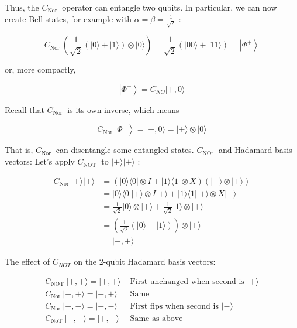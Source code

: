 \documentclass[main.tex]{subfiles}
\begin{document}
    Thus, the $C_{\text {Nor }}$ operator can entangle two qubits. In particular, we can now create Bell states, for example with $\alpha=\beta=\frac{1}{\sqrt{2}}$ :
    
    $$
    C_{\text {Nor }}\left(\frac{1}{\sqrt{2}}(|0\rangle+|1\rangle) \otimes|0\rangle\right)=\frac{1}{\sqrt{2}}(|00\rangle+|11\rangle)=\left|\Phi^{+}\right\rangle
    $$
    
    or, more compactly,
    
    $$
    \left|\Phi^{+}\right\rangle=C_{N O}|+, 0\rangle
    $$
    
    Recall that $C_{\text {Nor }}$ is its own inverse, which means
    
    $$
    C_{\text {Nor }}\left|\Phi^{+}\right\rangle=|+, 0\rangle=|+\rangle \otimes|0\rangle
    $$
    
    That is, $C_{\text {Nor }}$ can disentangle some entangled states. $C_{\text {NOr }}$ and Hadamard basis vectors: Let's apply $C_{\text {NOT }}$ to $|+\rangle|+\rangle$ :
    
    $$
    \begin{aligned}
    C_{\text {Nor }}|+\rangle|+\rangle &=(|0\rangle\langle 0|\otimes I+| 1\rangle\langle 1| \otimes X)(|+\rangle \otimes|+\rangle) \\
    &=|0\rangle\langle 0||+\rangle \otimes I|+\rangle+|1\rangle\langle 1||+\rangle \otimes X|+\rangle \\
    &=\frac{1}{\sqrt{2}}|0\rangle \otimes|+\rangle+\frac{1}{\sqrt{2}}|1\rangle \otimes|+\rangle \\
    &=\left(\frac{1}{\sqrt{2}}(|0\rangle+|1\rangle)\right) \otimes|+\rangle \\
    &=|+,+\rangle
    \end{aligned}
    $$
    
    The effect of $C_{N O T}$ on the 2-qubit Hadamard basis vectors:
    
    $$
    \begin{array}{ll}
    C_{\text {NOT }}|+,+\rangle=|+,+\rangle & \text { First unchanged when second is }|+\rangle \\
    C_{\text {Nor }}|-,+\rangle=|-,+\rangle & \text { Same } \\
    C_{\text {Nor }}|+,-\rangle=|-,-\rangle & \text { First fips when second is }|-\rangle \\
    C_{\text {NoT }}|-,-\rangle=|+,-\rangle & \text { Same as above }
    \end{array}
    $$
    
\end{document}
